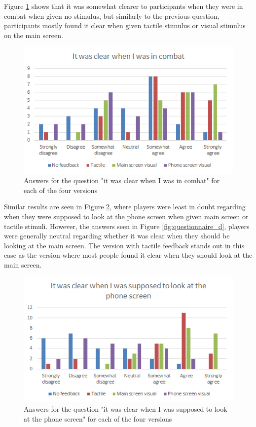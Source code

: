 Figure \ref{fig:questionnaire_b} shows that it was somewhat clearer to participants when they were in combat when given no stimulus, but similarly to the previous question, participants mostly found it clear when given tactile stimulus or visual stimulus on the main screen.

\begin{figure}[h!]
	\centering
	\includegraphics[scale=1]{figures/questionnaire_b.png}
	\caption{Answers for the question "it was clear when I was in combat" for each of the four versions}\label{fig:questionnaire_b}
\end{figure}

Similar results are seen in Figure \ref{fig:questionnaire_c}, where players were least in doubt regarding when they were supposed to look at the phone screen when given main screen or tactile stimuli. However, the answers seen in Figure \ref{fig:questionnaire_d}, players were generally neutral regarding whether it was clear when they should be looking at the main screen. The version with tactile feedback stands out in this case as the version where most people found it clear when they should look at the main screen.

\begin{figure}[h!]
	\centering
	\includegraphics[scale=1]{figures/questionnaire_c.png}
	\caption{Answers for the question "it was clear when I was supposed to look at the phone screen" for each of the four versions}\label{fig:questionnaire_c}
\end{figure}

